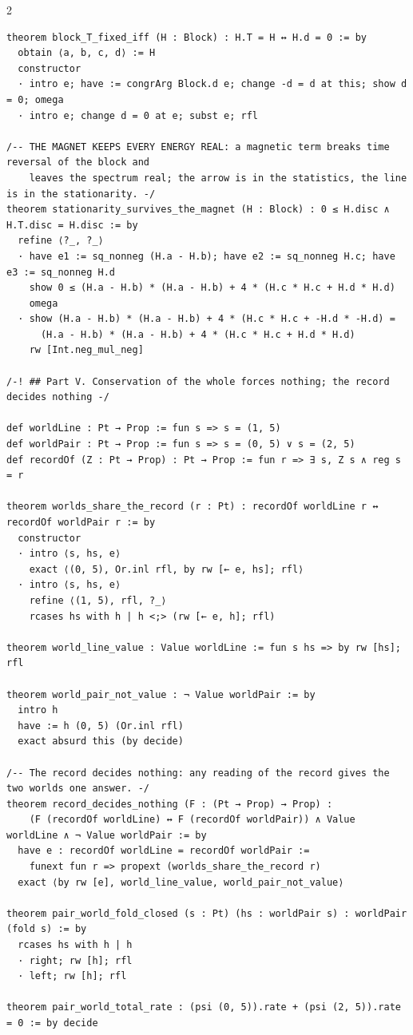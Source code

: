 \documentclass[10pt]{article}
\begin{document}
\begin{multicols}{2}
\begin{Verbatim}[fontsize=\fontsize{6.2}{7.2}\selectfont,breaklines,breakanywhere,breaksymbolleft={}]
theorem block_T_fixed_iff (H : Block) : H.T = H ↔ H.d = 0 := by
  obtain ⟨a, b, c, d⟩ := H
  constructor
  · intro e; have := congrArg Block.d e; change -d = d at this; show d = 0; omega
  · intro e; change d = 0 at e; subst e; rfl

/-- THE MAGNET KEEPS EVERY ENERGY REAL: a magnetic term breaks time reversal of the block and
    leaves the spectrum real; the arrow is in the statistics, the line is in the stationarity. -/
theorem stationarity_survives_the_magnet (H : Block) : 0 ≤ H.disc ∧ H.T.disc = H.disc := by
  refine ⟨?_, ?_⟩
  · have e1 := sq_nonneg (H.a - H.b); have e2 := sq_nonneg H.c; have e3 := sq_nonneg H.d
    show 0 ≤ (H.a - H.b) * (H.a - H.b) + 4 * (H.c * H.c + H.d * H.d)
    omega
  · show (H.a - H.b) * (H.a - H.b) + 4 * (H.c * H.c + -H.d * -H.d) =
      (H.a - H.b) * (H.a - H.b) + 4 * (H.c * H.c + H.d * H.d)
    rw [Int.neg_mul_neg]

/-! ## Part V. Conservation of the whole forces nothing; the record decides nothing -/

def worldLine : Pt → Prop := fun s => s = (1, 5)
def worldPair : Pt → Prop := fun s => s = (0, 5) ∨ s = (2, 5)
def recordOf (Z : Pt → Prop) : Pt → Prop := fun r => ∃ s, Z s ∧ reg s = r

theorem worlds_share_the_record (r : Pt) : recordOf worldLine r ↔ recordOf worldPair r := by
  constructor
  · intro ⟨s, hs, e⟩
    exact ⟨(0, 5), Or.inl rfl, by rw [← e, hs]; rfl⟩
  · intro ⟨s, hs, e⟩
    refine ⟨(1, 5), rfl, ?_⟩
    rcases hs with h | h <;> (rw [← e, h]; rfl)

theorem world_line_value : Value worldLine := fun s hs => by rw [hs]; rfl

theorem world_pair_not_value : ¬ Value worldPair := by
  intro h
  have := h (0, 5) (Or.inl rfl)
  exact absurd this (by decide)

/-- The record decides nothing: any reading of the record gives the two worlds one answer. -/
theorem record_decides_nothing (F : (Pt → Prop) → Prop) :
    (F (recordOf worldLine) ↔ F (recordOf worldPair)) ∧ Value worldLine ∧ ¬ Value worldPair := by
  have e : recordOf worldLine = recordOf worldPair :=
    funext fun r => propext (worlds_share_the_record r)
  exact ⟨by rw [e], world_line_value, world_pair_not_value⟩

theorem pair_world_fold_closed (s : Pt) (hs : worldPair s) : worldPair (fold s) := by
  rcases hs with h | h
  · right; rw [h]; rfl
  · left; rw [h]; rfl

theorem pair_world_total_rate : (psi (0, 5)).rate + (psi (2, 5)).rate = 0 := by decide


\end{Verbatim}
\end{multicols}
\end{document}
